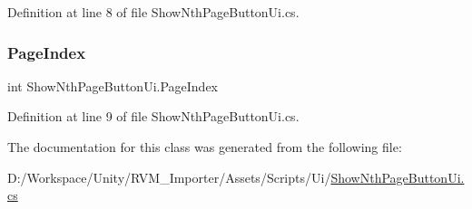 Definition at line 8 of file Show\+Nth\+Page\+Button\+Ui.\+cs.

\mbox{\label{class_show_nth_page_button_ui_ad2b792df63716831e4998506efe008e5}} 
\subsubsection{\texorpdfstring{PageIndex}{PageIndex}}
{\footnotesize\ttfamily int Show\+Nth\+Page\+Button\+Ui.\+Page\+Index}



Definition at line 9 of file Show\+Nth\+Page\+Button\+Ui.\+cs.



The documentation for this class was generated from the following file\+:\begin{DoxyCompactItemize}
\item 
D\+:/\+Workspace/\+Unity/\+R\+V\+M\+\_\+\+Importer/\+Assets/\+Scripts/\+Ui/\mbox{\hyperlink{_show_nth_page_button_ui_8cs}{Show\+Nth\+Page\+Button\+Ui.\+cs}}\end{DoxyCompactItemize}
